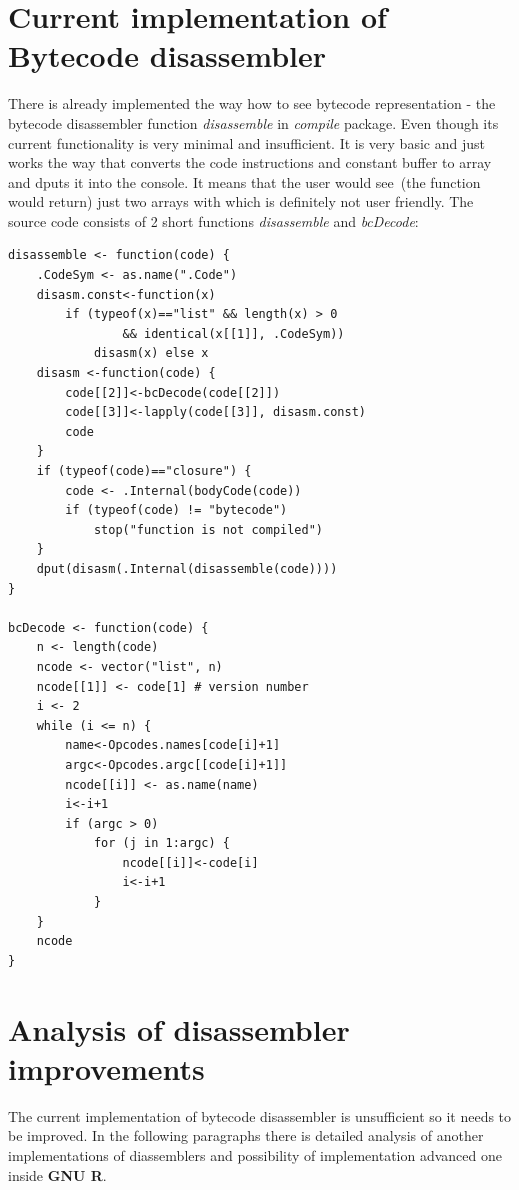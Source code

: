 \documentclass[thesis=M,english]{FITthesis}[2018/10/20]
\begin{document}
\section{Current implementation of Bytecode disassembler}\label{current-bc-disassembler}

There is already implemented the way how to see bytecode representation - the bytecode disassembler function \textit{disassemble} in \textit{compile} package. Even though its current functionality is very minimal and insufficient. It is very basic and just works the way that converts the code instructions and constant buffer to array and dputs it into the console. It means that the user would see~(the function would return) just two arrays with which is definitely not user friendly. The source code consists of 2 short functions \textit{disassemble} and \textit{bcDecode}:

\begin{lstlisting}
disassemble <- function(code) {
    .CodeSym <- as.name(".Code")
    disasm.const<-function(x)
        if (typeof(x)=="list" && length(x) > 0
        		&& identical(x[[1]], .CodeSym))
            disasm(x) else x
    disasm <-function(code) {
        code[[2]]<-bcDecode(code[[2]])
        code[[3]]<-lapply(code[[3]], disasm.const)
        code
    }
    if (typeof(code)=="closure") {
        code <- .Internal(bodyCode(code))
        if (typeof(code) != "bytecode")
            stop("function is not compiled")
    }
    dput(disasm(.Internal(disassemble(code))))
}

bcDecode <- function(code) {
    n <- length(code)
    ncode <- vector("list", n)
    ncode[[1]] <- code[1] # version number
    i <- 2
    while (i <= n) {
        name<-Opcodes.names[code[i]+1]
        argc<-Opcodes.argc[[code[i]+1]]
        ncode[[i]] <- as.name(name)
        i<-i+1
        if (argc > 0)
            for (j in 1:argc) {
                ncode[[i]]<-code[i]
                i<-i+1
            }
    }
    ncode
}
\end{lstlisting}

\section{Analysis of disassembler improvements}\label{analysis-of-disassembler}
The current implementation of bytecode disassembler is unsufficient so it needs to be improved. In the following paragraphs there is detailed analysis of another implementations of diassemblers and possibility of implementation advanced one inside \textbf{GNU R}.
\end{document}
